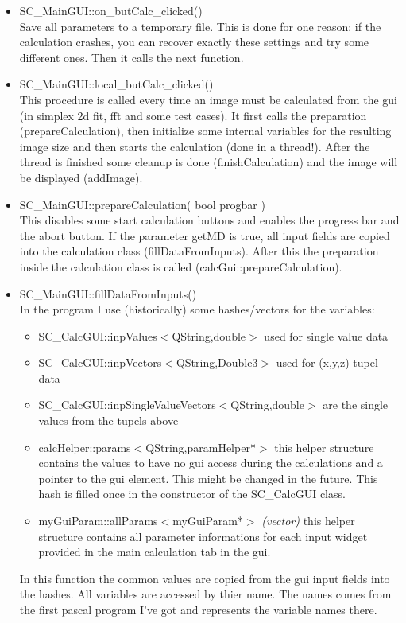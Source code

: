 \documentclass[11pt]{article} %
\begin{document}
\begin{itemize}
\item SC\_MainGUI::on\_butCalc\_clicked() \\
	Save all parameters to a temporary file. This is done for one reason: if the calculation crashes, you can recover exactly these settings and try some different ones. Then it calls the next function.

\item SC\_MainGUI::local\_butCalc\_clicked() \\
	This procedure is called every time an image must be calculated from the gui (in simplex 2d fit, fft and some test cases). It first calls the preparation (prepareCalculation), then initialize some internal variables for the resulting image size and then starts the calculation (done in a thread!). After the thread is finished some cleanup is done (finishCalculation) and the image will be displayed (addImage).

\item SC\_MainGUI::prepareCalculation( bool progbar ) \\   %
	This disables some start calculation buttons and enables the progress bar and the abort button. If the parameter getMD is true, all input fields are copied into the calculation class (fillDataFromInputs). After this the preparation inside the calculation class is called (calcGui::prepareCalculation).

\item SC\_MainGUI::fillDataFromInputs() \\
	In the program I use (historically) some hashes/vectors for the variables:
	\begin{itemize}\itemsep0pt
	\item SC\_CalcGUI::inpValues$<$QString,double$>$ used for single value data
	\item SC\_CalcGUI::inpVectors$<$QString,Double3$>$ used for (x,y,z) tupel data
	\item SC\_CalcGUI::inpSingleValueVectors$<$QString,double$>$ are the single values from the tupels above
	\item calcHelper::params$<$QString,paramHelper*$>$ this helper structure contains the values to have no gui access during the calculations and a pointer to the gui element. This might be changed in the future. This hash is filled once in the constructor of the SC\_CalcGUI class.
	\item myGuiParam::allParams$<$myGuiParam*$>$ {\it (vector)} this helper structure contains all parameter informations for each input widget provided in the main calculation tab in the gui.
	\end{itemize}
In this function the common values are copied from the gui input fields into the hashes. All variables are accessed by thier name. The names comes from the first pascal program I've got and represents the variable names there.


\end{itemize}
\end{document}
